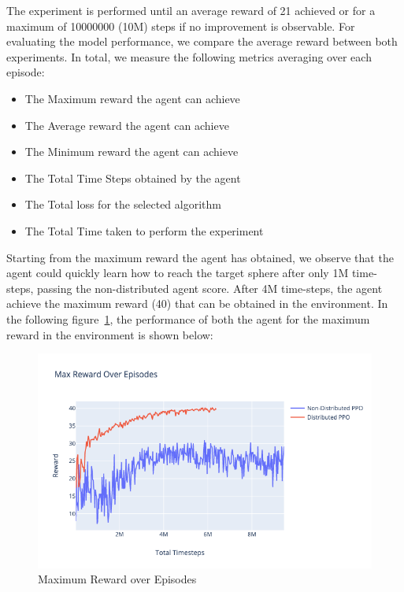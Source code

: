 The experiment is performed until an average reward of 21 achieved or for a maximum of 10000000 (10M) steps if no improvement is observable. For evaluating the model performance, we compare the average reward between both experiments. In total, we measure the following metrics averaging over each episode:
\begin{itemize}
    \item The Maximum reward the agent can achieve
    \item The Average reward the agent can achieve
    \item The Minimum reward the agent can achieve
    \item The Total Time Steps obtained by the agent
    \item The Total loss for the selected algorithm
    \item The Total Time taken to perform the experiment
\end{itemize}

Starting from the maximum reward the agent has obtained, we observe that the agent could quickly learn how to reach the target sphere after only 1M time-steps, passing the non-distributed agent score. After 4M time-steps, the agent achieve the maximum reward (40) that can be obtained in the environment. In the following figure~\ref{fig:2nd_exp_max_eps_reward}, the performance of both the agent for the maximum reward in the environment is shown below:
\begin{figure}[!htb]
    \centering
    \includegraphics[width=\linewidth]{figures/exps/2nd_exp/max_eps_reward.png}
    \caption{Maximum Reward over Episodes}
    \label{fig:2nd_exp_max_eps_reward}
\end{figure}

